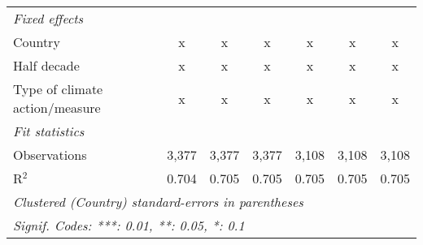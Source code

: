 \begin{tabular}{lcccccc}
   \emph{Fixed effects}\\
   Country                                                        & x       & x             & x             & x             & x             & x\\  
   Half decade                                                    & x       & x             & x             & x             & x             & x\\  
   Type of climate action/measure                                 & x       & x             & x             & x             & x             & x\\  
   \midrule \emph{Fit statistics}\\
   Observations                                                   & 3,377   & 3,377         & 3,377         & 3,108         & 3,108         & 3,108\\  
   R$^2$                                                          & 0.704   & 0.705         & 0.705         & 0.705         & 0.705         & 0.705\\  
   \midrule
   \multicolumn{7}{l}{\emph{Clustered (Country) standard-errors in parentheses}}\\
   \multicolumn{7}{l}{\emph{Signif. Codes: ***: 0.01, **: 0.05, *: 0.1}}\\
\end{tabular}
\par\endgroup


